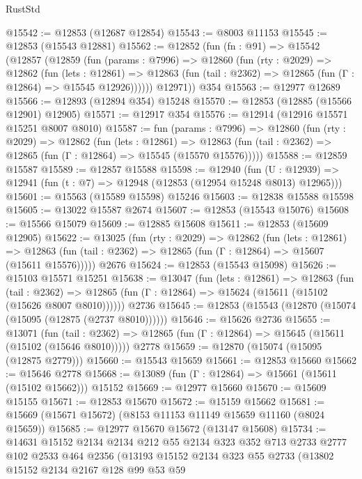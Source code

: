 \begin{lexlean}{RustStd}
\begin{coremodule}
@15542 := @12853 (@12687 @12854)
@15543 := @8003 @11153
@15545 := @12853 (@15543 @12881)
@15562 := @12852
    (fun (fn : @91) =>
    @15542
      (@12857
        (@12859
          (fun (params : @7996) =>
          @12860
            (fun (rty : @2029) =>
            @12862
              (fun (lets : @12861) =>
              @12863 (fun (tail : @2362) => @12865 (fun (Γ : @12864) => @15545 @12926))))))
        @12971))
    @354
@15563 := @12977 @12689
@15566 := @12893 (@12894 @354) @15248
@15570 := @12853 (@12885 (@15566 @12901) @12905)
@15571 := @12917 @354
@15576 := @12914 (@12916 @15571 @15251 @8007 @8010)
@15587 := fun (params : @7996) =>
  @12860
    (fun (rty : @2029) =>
    @12862
      (fun (lets : @12861) =>
      @12863 (fun (tail : @2362) => @12865 (fun (Γ : @12864) => @15545 (@15570 @15576)))))
@15588 := @12859 @15587
@15589 := @12857 @15588
@15598 := @12940
    (fun (U : @12939) => @12941 (fun (t : @7) => @12948 (@12853 (@12954 @15248 @8013) @12965)))
@15601 := @15563 (@15589 @15598) @15246
@15603 := @12838 @15588 @15598
@15605 := @13022 @15587 @2674
@15607 := @12853 (@15543 @15076)
@15608 := @15566 @15079
@15609 := @12885 @15608
@15611 := @12853 (@15609 @12905)
@15622 := @13025
    (fun (rty : @2029) =>
    @12862
      (fun (lets : @12861) =>
      @12863 (fun (tail : @2362) => @12865 (fun (Γ : @12864) => @15607 (@15611 @15576)))))
    @2676
@15624 := @12853 (@15543 @15098)
@15626 := @15103 @15571 @15251
@15638 := @13047
    (fun (lets : @12861) =>
    @12863
      (fun (tail : @2362) =>
      @12865 (fun (Γ : @12864) => @15624 (@15611 (@15102 (@15626 @8007 @8010))))))
    @2736
@15645 := @12853 (@15543 (@12870 (@15074 (@15095 (@12875 (@2737 @8010))))))
@15646 := @15626 @2736
@15655 := @13071
    (fun (tail : @2362) => @12865 (fun (Γ : @12864) => @15645 (@15611 (@15102 (@15646 @8010)))))
    @2778
@15659 := @12870 (@15074 (@15095 (@12875 @2779)))
@15660 := @15543 @15659
@15661 := @12853 @15660
@15662 := @15646 @2778
@15668 := @13089 (fun (Γ : @12864) => @15661 (@15611 (@15102 @15662))) @15152
@15669 := @12977 @15660
@15670 := @15609 @15155
@15671 := @12853 @15670
@15672 := @15159 @15662
@15681 := @15669 (@15671 @15672) (@8153 @11153 @11149 @15659 @11160 (@8024 @15659))
@15685 := @12977 @15670 @15672 (@13147 @15608)
@15734 := @14631
    @15152
    @2134
    @2134
    @212
    @55
    @2134
    @323
    @352
    @713
    @2733
    @2777
    @102
    @2533
    @464
    @2356
    (@13193
      @15152
      @2134
      @323
      @55
      @2733
      (@13802
        @15152
        @2134
        @2167
        @128
        @99
        @53
        @59

\end{coremodule}
\end{lexlean}
